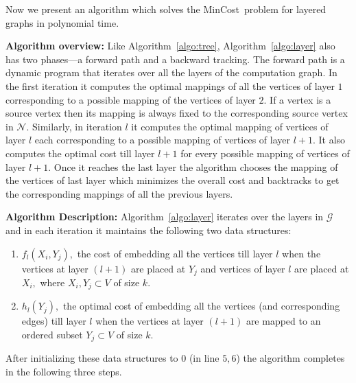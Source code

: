 \documentclass[journal]{IEEEtran}
\newcommand{\net}{\mathcal{N}}
\newcommand{\netnodes}{V}
\newcommand{\compgraph}{\mathcal{G}}
\newcommand{\mincost}{\textsf{MinCost}}
\begin{document}
Now we present an algorithm which solves the \mincost\ problem for
layered graphs in polynomial time.

\textbf{Algorithm overview:} Like Algorithm~\ref{algo:tree},
Algorithm~\ref{algo:layer} also has two phases---a forward path and a
backward tracking. The forward path is a dynamic program that iterates
over all the layers of the computation graph. In the first iteration
it computes the optimal mappings of all the vertices of layer $1$
corresponding to a possible mapping of the vertices of layer $2.$ If a
vertex is a source vertex then its mapping is always fixed to the
corresponding source vertex in $\net.$ Similarly, in iteration $l$ it
computes the optimal mapping of vertices of layer $l$ each
corresponding to a possible mapping of vertices of layer $l+1.$ It
also computes the optimal cost till layer $l+1$ for every possible
mapping of vertices of layer $l+1.$ Once it reaches the last layer the
algorithm chooses the mapping of the vertices of last layer which
minimizes the overall cost and backtracks to get the corresponding
mappings of all the previous layers. 

\textbf{Algorithm Description:} Algorithm~\ref{algo:layer} iterates
over the layers in $\compgraph$ and in each iteration it maintains the
following two data structures:
\begin{enumerate}
\item $f_l(X_i,Y_j),$ the cost of embedding all the vertices till
  layer $l$ when the vertices at layer $(l+1)$ are placed at $Y_j$ and
  vertices of layer $l$ are placed at $X_i,$ where $X_i,Y_j \subset
  \netnodes$ of size $k.$
\item $h_l(Y_j),$ the optimal cost of embedding all the vertices (and
  corresponding edges) till layer $l$ when the vertices at layer
  $(l+1)$ are mapped to an ordered subset $Y_j \subset \netnodes$ of
  size $k.$
\end{enumerate}

After initializing these data structures to $0$ (in line $5,6$) the
algorithm completes in the following three steps.
\end{document}
